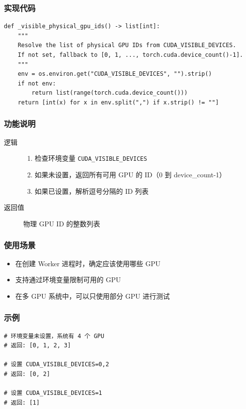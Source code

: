 \documentclass[12pt,a4paper]{article}
\begin{document}
\subsubsection{实现代码}

\begin{lstlisting}
def _visible_physical_gpu_ids() -> list[int]:
    """
    Resolve the list of physical GPU IDs from CUDA_VISIBLE_DEVICES.
    If not set, fallback to [0, 1, ..., torch.cuda.device_count()-1].
    """
    env = os.environ.get("CUDA_VISIBLE_DEVICES", "").strip()
    if not env:
        return list(range(torch.cuda.device_count()))
    return [int(x) for x in env.split(",") if x.strip() != ""]
\end{lstlisting}

\subsubsection{功能说明}

\begin{description}
    \item[逻辑]
    \begin{enumerate}
        \item 检查环境变量 \texttt{CUDA\_VISIBLE\_DEVICES}
        \item 如果未设置，返回所有可用 GPU 的 ID（0 到 device\_count-1）
        \item 如果已设置，解析逗号分隔的 ID 列表
    \end{enumerate}
    \item[返回值] 物理 GPU ID 的整数列表
\end{description}

\subsubsection{使用场景}

\begin{itemize}
    \item 在创建 Worker 进程时，确定应该使用哪些 GPU
    \item 支持通过环境变量限制可用的 GPU
    \item 在多 GPU 系统中，可以只使用部分 GPU 进行测试
\end{itemize}

\subsubsection{示例}

\begin{lstlisting}
# 环境变量未设置，系统有 4 个 GPU
# 返回: [0, 1, 2, 3]

# 设置 CUDA_VISIBLE_DEVICES=0,2
# 返回: [0, 2]

# 设置 CUDA_VISIBLE_DEVICES=1
# 返回: [1]
\end{lstlisting}
\end{document}
